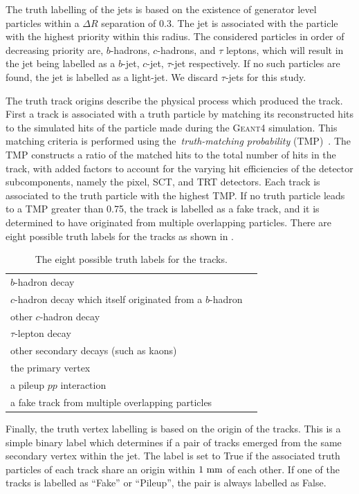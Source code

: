 The truth labelling of the jets is based on the existence of generator level particles within a $\Delta R$ separation of 0.3.
The jet is associated with the particle with the highest priority within this radius.
The considered particles in order of decreasing priority are, $b$-hadrons, $c$-hadrons, and $\tau$ leptons, which will result in the jet being labelled as a $b$-jet, $c$-jet, $\tau$-jet respectively.
If no such particles are found, the jet is labelled as a light-jet.
We discard $\tau$-jets for this study.

The truth track origins describe the physical process which produced the track.
First a track is associated with a truth particle by matching its reconstructed hits to the simulated hits of the particle made during the \textsc{Geant4} simulation.
This matching criteria is performed using the~\textit{truth-matching probability} (TMP)~\cite{TMP}.
The TMP constructs a ratio of the matched hits to the total number of hits in the track, with added factors to account for the varying hit efficiencies of the detector subcomponents, namely the pixel, SCT, and TRT detectors.
Each track is associated to the truth particle with the highest TMP.
If no truth particle leads to a TMP greater than 0.75, the track is labelled as a fake track, and it is determined to have originated from multiple overlapping particles.
There are eight possible truth labels for the tracks as shown in .

\begin{table}
    \centering
    \begin{tabular}{ll}
        \toprule
        $b$-hadron decay \\
        $c$-hadron decay which itself originated from a $b$-hadron \\
        other $c$-hadron decay \\
        $\tau$-lepton decay \\
        other secondary decays (such as kaons) \\
        the primary vertex \\
        a pileup $pp$ interaction \\
        a fake track from multiple overlapping particles \\
        \bottomrule
    \end{tabular}
    \caption{The eight possible truth labels for the tracks.}
    \label{tab:track_labels}
\end{table}

Finally, the truth vertex labelling is based on the origin of the tracks.
This is a simple binary label which determines if a pair of tracks emerged from the same secondary vertex within the jet.
The label is set to True if the associated truth particles of each track share an origin within $1~\mm$ of each other.
If one of the tracks is labelled as ``Fake'' or ``Pileup'', the pair is always labelled as False.

